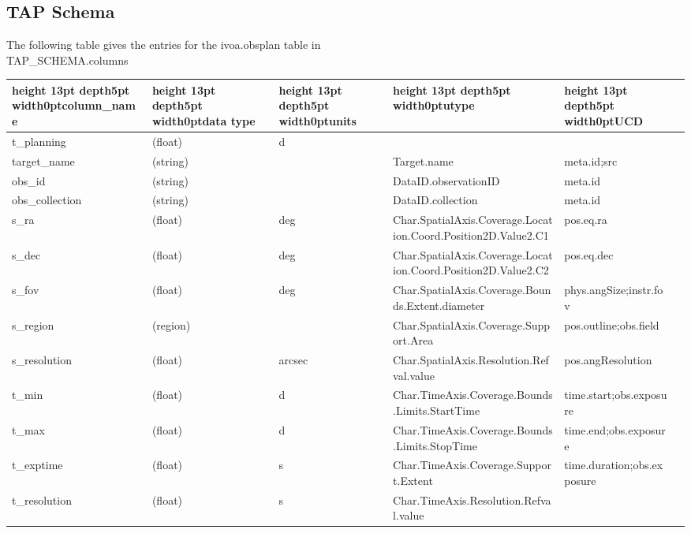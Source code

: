 \documentclass[11pt,a4paper]{ivoa}
\begin{document}
\subsection{TAP Schema}
The following table gives the entries for the ivoa.obsplan table in\\
TAP\_SCHEMA.columns

\begin{landscape}
\begin{table}
\def\hlstrut{\vrule height 13pt depth5pt width0pt}
\begin{tabular}{ |l|l|l|l|l|l| }
\hline
\hlstrut\textbf{column\_name} &
\hlstrut\textbf{data type} &
\hlstrut\textbf{units} &
\hlstrut\textbf{utype} &
\hlstrut\textbf{UCD} \\
\hline
t\_planning &
(float) &
d &
&
\\
\hline
target\_name &
(string) &
&
Target.name &
meta.id;src \\
\hline
obs\_id &
(string) &
&
DataID.observationID &
meta.id \\
\hline
obs\_collection &
(string) &
&
DataID.collection &
meta.id \\
\hline
s\_ra &
(float) &
deg &
Char.SpatialAxis.Coverage.Location.Coord.Position2D.Value2.C1 &
pos.eq.ra \\
\hline
s\_dec &
(float) &
deg &
Char.SpatialAxis.Coverage.Location.Coord.Position2D.Value2.C2 &
pos.eq.dec \\
\hline
s\_fov &
(float) &
deg &
Char.SpatialAxis.Coverage.Bounds.Extent.diameter &
phys.angSize;instr.fov \\
\hline
s\_region &
(region) &
&
Char.SpatialAxis.Coverage.Support.Area &
pos.outline;obs.field \\
\hline
s\_resolution &
(float) &
arcsec &
Char.SpatialAxis.Resolution.Refval.value &
pos.angResolution \\
\hline
t\_min &
(float) &
d &
Char.TimeAxis.Coverage.Bounds.Limits.StartTime &
time.start;obs.exposure \\
\hline
t\_max &
(float) &
d &
Char.TimeAxis.Coverage.Bounds.Limits.StopTime &
time.end;obs.exposure \\
\hline
t\_exptime &
(float) &
s &
Char.TimeAxis.Coverage.Support.Extent &
time.duration;obs.exposure \\
\hline
t\_resolution &
(float) &
s &
Char.TimeAxis.Resolution.Refval.value &

\end{tabular}
\end{table}
\end{landscape}
\end{document}

